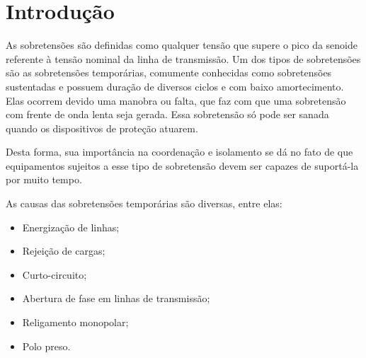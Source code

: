 \section{Introdução}


\begin{comment}
Apesar da definição generalizada, elas são caracterizadas de diversas formas. Este documento tratará apenas das sobretensões temporárias. O documento também tratará de um resumo básico da análise do regime permanente para que seja possível entender as sobretensões.
\end{comment}


As sobretensões são definidas como qualquer tensão que supere o pico da senoide referente à tensão nominal da linha de transmissão. Um dos tipos de sobretensões são as sobretensões temporárias, comumente conhecidas como sobretensões sustentadas e possuem duração de diversos ciclos e com baixo amortecimento. Elas ocorrem devido uma manobra ou falta, que faz com que uma sobretensão com frente de onda lenta seja gerada. Essa sobretensão só pode ser sanada quando os dispositivos de proteção atuarem.

Desta forma, sua importância na coordenação e isolamento se dá no fato de que equipamentos sujeitos a esse tipo de sobretensão devem ser capazes de suportá-la por muito tempo.

\begin{comment}
A solução da rede em regime permanente permite obter as sobretensões temporárias de origens já discutidas, inclusive diante de fenômenos lineares, quando a parcela transitória está amortecida. Há casos em que as sobretensões de longa duração apresentem constantes de tempo não amortecidas, assim inviabilizam a análise em regime permanente. 

Porém, no caso não linear, com a presença de circuitos chaveados ou transformadores em saturação, recorre-se à simulação no tempo das sobretensões. Como as ondas distorcidas contêm harmônicas em seu espectro, a rede elétrica deve estar bem representada nas frequências naturais de oscilação, de forma a garantir a confiabilidade na resposta no tempo em termos numéricos.
\end{comment}

As causas das sobretensões temporárias são diversas, entre elas:

\begin{itemize}
    \item Energização de linhas;
    \item Rejeição de cargas;
    \item Curto-circuito;
    \item Abertura de fase em linhas de transmissão;
    \item Religamento monopolar;
    \item Polo preso.
\end{itemize}






%

\newpage